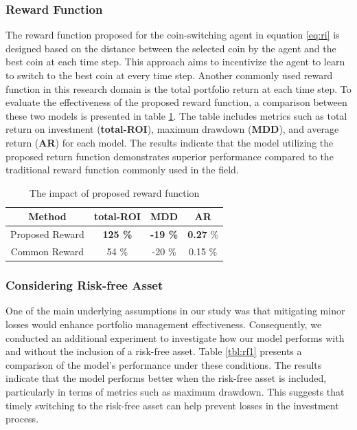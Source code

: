 \subsubsection{Reward Function}
The reward function proposed for the coin-switching agent in equation \ref{eq:ri} is designed based on the distance between the selected coin by the agent and the best coin at each time step. This approach aims to incentivize the agent to learn to switch to the best coin at every time step. Another commonly used reward function in this research domain is the total portfolio return at each time step. To evaluate the effectiveness of the proposed reward function, a comparison between these two models is presented in table \ref{tbl:rewards}. The table includes metrics such as total return on investment (\textbf{total-ROI}), maximum drawdown (\textbf{MDD}), and average return (\textbf{AR}) for each model. The results indicate that the model utilizing the proposed return function demonstrates superior performance compared to the traditional reward function commonly used in the field.


\begin{table}[h]
	\centering
	\caption{The impact of proposed reward function}
	\label{tbl:rewards}
	\begin{tabular}{c | c | c | c  }
		Method & total-ROI & MDD & AR \\
		\hline
		\hline
		Proposed Reward & \textbf{125 \%}  & \textbf{-19 \%} & \textbf{0.27}  \% \\
		Common Reward & 54 \%  & -20 \%  & 0.15 \%\\
	\end{tabular}
\end{table}


\subsubsection{Considering Risk-free Asset}
One of the main underlying assumptions in our study was that mitigating minor losses would enhance portfolio management effectiveness. Consequently, we conducted an additional experiment to investigate how our model performs with and without the inclusion of a risk-free asset. Table \ref{tbl:rf1} presents a comparison of the model's performance under these conditions. The results indicate that the model performs better when the risk-free asset is included, particularly in terms of metrics such as maximum drawdown. This suggests that timely switching to the risk-free asset can help prevent losses in the investment process.

